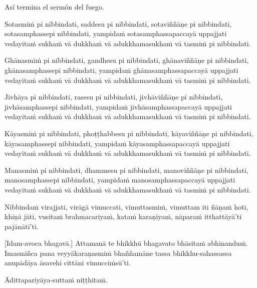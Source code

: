 Así termina el sermón del fuego.

\clearpage

\paliText
\markboth{\paliTitle}{\rightmark}

Sotasmiṁ pi nibbindati, saddesu pi nibbindati, sotaviññāṇe pi
nibbindati, sotasamphassepi nibbindati, yampidaṁ sotasamphassapaccayā
uppajjati vedayitaṁ sukhaṁ vā dukkhaṁ vā adukkhamasukhaṁ vā tasmiṁ pi
nibbindati.

Ghānasmiṁ pi nibbindati, gandhesu pi nibbindati, ghānaviññāṇe pi
nibbindati, ghānasamphassepi nibbindati, yampidaṁ ghānasamphassapaccayā
uppajjati vedayitaṁ sukhaṁ vā dukkhaṁ vā adukkhamasukhaṁ vā tasmiṁ pi
nibbindati.

Jivhāya pi nibbindati, rasesu pi nibbindati, jivhāviññāṇe pi nibbindati,
jivhāsamphassepi nibbindati, yampidaṁ jivhāsamphassapaccayā uppajjati
vedayitaṁ sukhaṁ vā dukkhaṁ vā adukkhamasukhaṁ vā tasmiṁ pi nibbindati.

Kāyasmiṁ pi nibbindati, phoṭṭhabbesu pi nibbindati, kāyaviññāṇe pi
nibbindati, kāyasamphassepi nibbindati, yampidaṁ kāyasamphassapaccayā
uppajjati vedayitaṁ sukhaṁ vā dukkhaṁ vā adukkhamasukhaṁ vā tasmiṁ pi
nibbindati.

Manasmiṁ pi nibbindati, dhammesu pi nibbindati, manoviññāṇe pi
nibbindati, manosamphassepi nibbindati, yampidaṁ manosamphassapaccayā
uppajjati vedayitaṁ sukhaṁ vā dukkhaṁ vā adukkhamasukhaṁ vā tasmiṁ pi
nibbindati.

Nibbindaṁ virajjati, virāgā vimuccati, vimuttasmiṁ, vimuttam iti ñāṇaṁ
hoti, khīṇā jāti, vusitaṁ brahmacariyaṁ, kataṁ karaṇīyaṁ, nāparaṁ
itthattāyā'ti pajānātī'ti.

\enlargethispage{\baselineskip}

[Idam-avoca bhagavā.] Attamanā te bhikkhū bhagavato bhāsitaṁ abhinanduṁ.
Imasmiñca pana veyyākaraṇasmiṁ bhaññamāne tassa bhikkhu-sahassassa
anupādāya āsavehi cittāni vimucciṁsū'ti.

Ādittapariyāya-suttaṁ niṭṭhitaṁ.

\resumeNormalText

